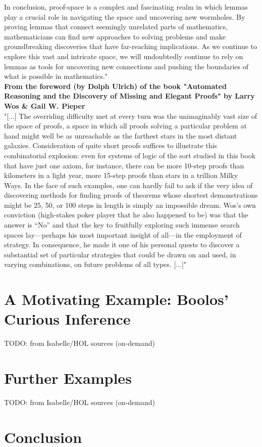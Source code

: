 \documentclass{article}
\begin{document}
In conclusion, proof-space is a complex and fascinating realm in which lemmas play a crucial role in navigating the space and uncovering new wormholes. By proving lemmas that connect seemingly unrelated parts of mathematics, mathematicians can find new approaches to solving problems and make groundbreaking discoveries that have far-reaching implications. As we continue to explore this vast and intricate space, we will undoubtedly continue to rely on lemmas as tools for uncovering new connections and pushing the boundaries of what is possible in mathematics."
\\
\textbf{From the foreword (by Dolph Ulrich) of the book "Automated Reasoning and the Discovery of Missing and Elegant Proofs" by Larry Wos \& Gail W. Pieper}
\\
"[...] The overriding difficulty met at every turn was the unimaginably vast size of the space of proofs, a space in which all proofs solving a particular problem at hand might well be as unreachable as the farthest stars in the most distant galaxies. Consideration of quite short proofs suffices to illustrate this combinatorial explosion: even for systems of logic of the sort studied in this book that have just one axiom, for instance, there can be more 10-step proofs than kilometers in a light year, more 15-step proofs than stars in a trillion Milky Ways.
In the face of such examples, one can hardly fail to ask if the very idea of discovering methods for finding proofs of theorems whose shortest demonstrations might be 25, 50, or 100 steps in length is simply an impossible dream. Wos’s own conviction (high-stakes poker player that he also happened to be) was that the answer is “No” and that the key to fruitfully exploring such immense search spaces lay—perhaps his most important insight of all—in the employment of strategy. In consequence, he made it one of his personal quests to discover a substantial set of particular strategies that could be drawn on and used, in varying combinations, on future problems of all types. [...]"


\section{A Motivating Example: Boolos' Curious Inference}

TODO: from Isabelle/HOL sources (on-demand)

\section{Further Examples}
TODO: from Isabelle/HOL sources (on-demand)

\section{Conclusion}
\end{document}
